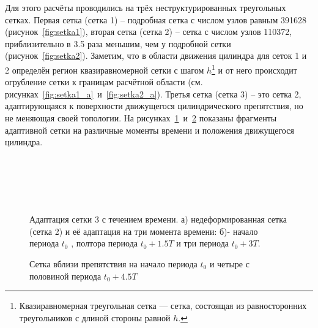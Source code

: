 Для этого расчёты проводились на трёх неструктурированных треугольных сетках. Первая сетка (сетка 1) – подробная сетка с числом узлов равным 391628 (рисунок~\ref{fig:setka1}), вторая сетка (сетка 2) – сетка с числом узлов 110372, приблизительно в 3.5 раза меньшим, чем у подробной сетки (рисунок~\ref{fig:setka2}).  Заметим, что в области движения цилиндра для сеток 1 и 2 определён регион квазиравномерной сетки с шагом $h$\footnote{ Квазиравномерная треугольная сетка — сетка, состоящая из равносторонних треугольников с длиной стороны равной $h$.} и от него происходит огрубление сетки к границам расчётной области (см. рисунках~\ref{fig:setka1_a}~и~\ref{fig:setka2_a}).
Третья сетка (сетка 3) -- это сетка 2, адаптирующаяся к поверхности движущегося цилиндрического препятствия, но не меняющая своей топологии. На рисунках~\ref{fig:setka3_mov}~и~\ref{fig:setka3_zoom} показаны фрагменты адаптивной сетки на различные моменты времени и положения движущегося цилиндра.
\begin{figure}
	{\centering
		\\
		\\
		\\
		\\
	}
	\caption[Адаптация сетки 3 с течением времени]{Адаптация сетки 3 с течением времени. а) недеформированная сетка (сетка 2) и её адаптация на три момента времени: б)- начало периода $t_0$ , полтора периода $t_0+1.5T$ и три периода $t_0+3T$.}
	\label{fig:setka3_mov}
\end{figure}
\begin{figure}
	\begin{minipage}{0.45\linewidth}
	\end{minipage}
	\hfill
	\begin{minipage}{0.45\linewidth}
	\end{minipage} 
	\vspace{10 pt}
	\caption{Сетка вблизи препятствия на начало периода $t_0$ и четыре с половиной периода $t_0+4.5T$ }
	\label{fig:setka3_zoom}
\end{figure}

